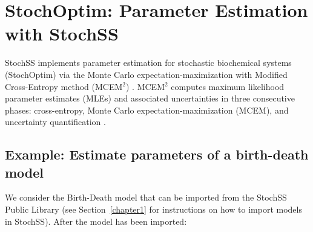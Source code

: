 \chapter{StochOptim: Parameter Estimation with StochSS}
\label{chapter-stochoptim}

StochSS implements parameter estimation for stochastic biochemical systems (StochOptim) via the Monte Carlo expectation-maximization with Modified Cross-Entropy method (MCEM$^2$) \cite{bernie}.
MCEM$^2$ computes maximum likelihood parameter estimates (MLEs) and associated uncertainties in three consecutive phases: cross-entropy, Monte Carlo expectation-maximization (MCEM), and uncertainty quantification \cite{bernie}.

\section{Example: Estimate parameters of a birth-death model}
We consider the Birth-Death model that can be imported from the StochSS Public Library (see Section~\ref{chapter1} for instructions on how to import models in StochSS).
After the model has been imported:
